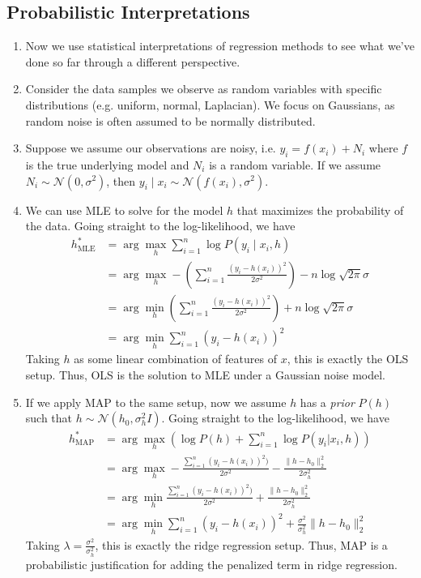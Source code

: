\documentclass[10pt]{article}
\begin{document}
\begin{multicols}{2}
\begin{addmargin}[0.8em]{0.5em}
    \subsection{Probabilistic Interpretations}
    \vspace{-0.2cm}
    \begin{enumerate}[label=(\alph*)]
        \item Now we use statistical interpretations of regression methods to see what we’ve done so far through a different perspective.
        \item Consider the data samples we observe as random variables with specific distributions (e.g. uniform, normal, Laplacian). We focus on Gaussians, as random noise is often assumed to be normally distributed.
        \item Suppose we assume our observations are noisy, i.e. $y_i = f(x_i) + N_i$ where $f$ is the true underlying model and $N_i$ is a random variable. If we assume $N_i \sim \mathcal{N}(0, \sigma^2)$, then $y_i \mid x_i \sim \mathcal{N}(f(x_i), \sigma^2)$.
        
        \item We can use MLE to solve for the model $h$ that maximizes the probability of the data. Going straight to the log-likelihood, we have
        \begin{align*}
        h^{*}_{\text{MLE}} &= \arg\max_{h} \sum_{i=1}^{n} \log{P(y_i \mid x_i, h)} \\
        &= \arg\max_{h} - \left( \sum_{i=1}^{n} \frac{(y_i - h(x_i))^2}{2\sigma^2} \right) - n\log{\sqrt{2\pi}\sigma} \\
        &= \arg\min_{h} \left( \sum_{i=1}^{n} \frac{(y_i - h(x_i))^2}{2\sigma^2} \right) + n\log{\sqrt{2\pi}\sigma} \\
        &= \arg\min_{h}  \sum_{i=1}^{n} (y_i - h(x_i))^2       
        \end{align*}
        Taking $h$ as some linear combination of features of $x$, this is exactly the OLS setup. Thus, OLS is the solution to MLE under a Gaussian noise model.
        \item If we apply MAP to the same setup, now we assume $h$ has a \textit{prior} $P(h)$ such that $h \sim \mathcal{N}(h_0, \sigma^2_h I)$. Going straight to the log-likelihood, we have
        \begin{align*}
        h^*_{\text{MAP}} &= \arg\max_{h} \left( \log{P(h)} + \sum_{i=1}^n \log{P(y_i | x_i, h)} \right) \\
        &= \arg\max_{h} - \frac{\sum_{i=1}^{n} (y_i - h(x_i))^2)}{2\sigma^2} - \frac{\| h - h_0 \|_2^2}{2\sigma_h^2}  \\
        &= \arg\min_{h}   \frac{\sum_{i=1}^{n} (y_i - h(x_i))^2)}{2\sigma^2} +  \frac{\| h - h_0 \|_2^2}{2\sigma_h^2}  \\
        &= \arg\min_{h} \sum_{i=1}^{n} (y_i - h(x_i))^2  + \frac{\sigma^2}{\sigma_h^2}  \| h - h_0 \|_2^2
        \end{align*}
        Taking $\lambda = \frac{\sigma^2}{\sigma_h^2}$, this is exactly the ridge regression setup. Thus, MAP is a probabilistic justification for adding the penalized term in ridge regression. 
        

\end{enumerate}
\end{addmargin}
\end{multicols}
\end{document}
